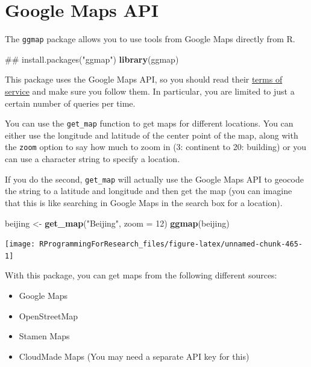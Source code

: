 \documentclass[]{book}
\makeatletter
\newenvironment{Shaded}{\begin{snugshade}}{\end{snugshade}}
\newcommand{\KeywordTok}[1]{\textcolor[rgb]{0.13,0.29,0.53}{\textbf{{#1}}}}
\newcommand{\DataTypeTok}[1]{\textcolor[rgb]{0.13,0.29,0.53}{{#1}}}
\newcommand{\DecValTok}[1]{\textcolor[rgb]{0.00,0.00,0.81}{{#1}}}
\newcommand{\StringTok}[1]{\textcolor[rgb]{0.31,0.60,0.02}{{#1}}}
\newcommand{\NormalTok}[1]{{#1}}
\providecommand{\tightlist}{%
  \setlength{\itemsep}{0pt}\setlength{\parskip}{0pt}}
\newenvironment{kframe}{%
\medskip{}
\setlength{\fboxsep}{.8em}
 \def\at@end@of@kframe{}%
 \ifinner\ifhmode%
  \def\at@end@of@kframe{\end{minipage}}%
  \begin{minipage}{\columnwidth}%
 \fi\fi%
 \def\FrameCommand##1{\hskip\@totalleftmargin \hskip-\fboxsep
 \colorbox{shadecolor}{##1}\hskip-\fboxsep
     \hskip-\linewidth \hskip-\@totalleftmargin \hskip\columnwidth}%
 \MakeFramed {\advance\hsize-\width
   \@totalleftmargin\z@ \linewidth\hsize
   \@setminipage}}%
 {\par\unskip\endMakeFramed%
 \at@end@of@kframe}
\renewenvironment{Shaded}{\begin{kframe}}{\end{kframe}}
\makeatother
\begin{document}
\section{Google Maps API}\label{google-maps-api}

The \texttt{ggmap} package allows you to use tools from Google Maps
directly from R.

\begin{Shaded}
\begin{Highlighting}[]
\NormalTok{## install.packages("ggmap")}
\KeywordTok{library}\NormalTok{(ggmap)}
\end{Highlighting}
\end{Shaded}

This package uses the Google Maps API, so you should read their
\href{http://developers.google.com/maps/terms}{terms of service} and
make sure you follow them. In particular, you are limited to just a
certain number of queries per time.

You can use the \texttt{get\_map} function to get maps for different
locations. You can either use the longitude and latitude of the center
point of the map, along with the \texttt{zoom} option to say how much to
zoom in (3: continent to 20: building) or you can use a character string
to specify a location.

If you do the second, \texttt{get\_map} will actually use the Google
Maps API to geocode the string to a latitude and longitude and then get
the map (you can imagine that this is like searching in Google Maps in
the search box for a location).

\begin{Shaded}
\begin{Highlighting}[]
\NormalTok{beijing <-}\StringTok{ }\KeywordTok{get_map}\NormalTok{(}\StringTok{"Beijing"}\NormalTok{, }\DataTypeTok{zoom =} \DecValTok{12}\NormalTok{)}
\KeywordTok{ggmap}\NormalTok{(beijing)}
\end{Highlighting}
\end{Shaded}

\begin{center}\texttt{[image: RProgrammingForResearch\_files/figure-latex/unnamed-chunk-465-1]} \end{center}

With this package, you can get maps from the following different
sources:

\begin{itemize}
\tightlist
\item
  Google Maps
\item
  OpenStreetMap
\item
  Stamen Maps
\item
  CloudMade Maps (You may need a separate API key for this)
\end{itemize}
\end{document}
